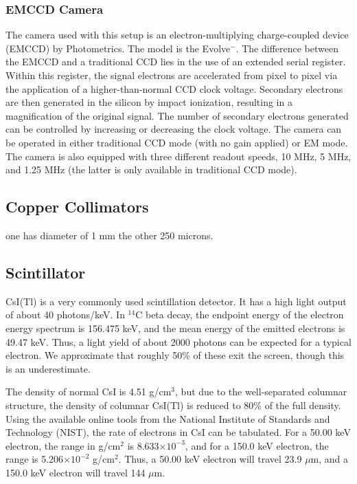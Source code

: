\documentclass[11pt]{amsart}
\begin{document}
\subsubsection{EMCCD Camera}
The camera used with this setup is an electron-multiplying charge-coupled device (EMCCD) by Photometrics.  The model is the Evolve$^-$.  The difference between the EMCCD and a traditional CCD lies in the use of an extended serial register.  Within this register, the signal electrons are accelerated from pixel to pixel via the application of a higher-than-normal CCD clock voltage.  Secondary electrons are then generated in the silicon by impact ionization, resulting in a magnification of the original signal.  The number of secondary electrons generated can be controlled by increasing or decreasing the clock voltage.  The camera can be operated in either traditional CCD mode (with no gain applied) or EM mode.  The camera is also equipped with three different readout speeds, 10 MHz, 5 MHz, and 1.25 MHz (the latter is only available in traditional CCD mode).   



\subsection{Copper Collimators}
one has diameter of 1 mm the other 250 microns.
\subsection{Scintillator}\label{sec:CsI}
CsI(Tl) is a very commonly used scintillation detector.  It has a high light output of about 40 photons/keV.  In $^{14}$C beta decay, the endpoint energy of the electron energy spectrum is 156.475 keV, and the mean energy of the emitted electrons is 49.47 keV.  Thus, a light yield of about 2000 photons can be expected for a typical electron.  We approximate that roughly 50\% of these exit the screen, though this is an underestimate.

The density of normal CsI is 4.51 g/cm$^3$, but due to the well-separated columnar structure, the density of columnar CsI(Tl) is reduced to 80\% of the full density.  Using the available online tools from the National Institute of Standards and Technology (NIST), the rate of electrons in CsI can be tabulated.  For a 50.00 keV electron, the range in g/cm$^2$ is 8.633$\times10^{-3}$, and for a 150.0 keV electron, the range is 5.206$\times10^{-2}$ g/cm$^2$.  Thus, a 50.00 keV electron will travel 23.9 $\mu$m, and a 150.0 keV electron will travel 144 $\mu$m.  
\end{document}
